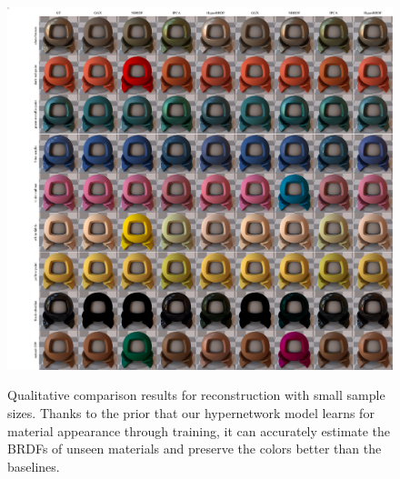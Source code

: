 \begin{figure}[t]
  {\includegraphics[width=0.9\linewidth]{Chapters/hyperbrdf-figs/qual_comp_ggx_2.pdf}}
\\
   \caption{Qualitative comparison results for reconstruction with small sample sizes. Thanks to the prior that our hypernetwork model learns for material appearance through training, it can accurately estimate the BRDFs of unseen materials and preserve the colors better than the baselines.}  

   \label{fig:imp_comp_upt}
\end{figure}

